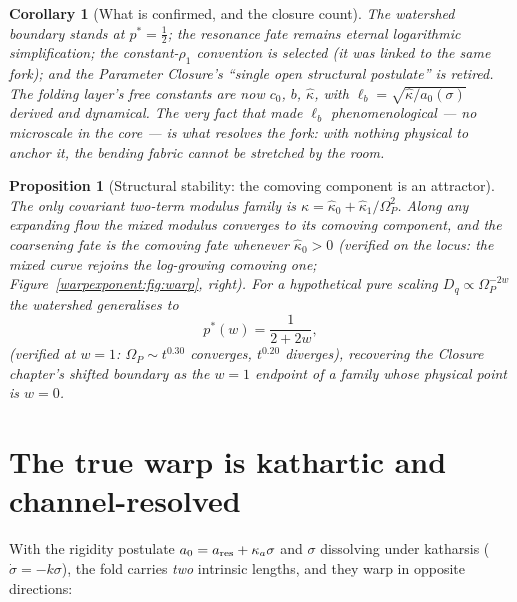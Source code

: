 \documentclass[11pt,a4paper,oneside]{book}
\newcommand{\Op}{\Omega_P}
\newcommand{\Dq}{D_q}
\newcommand{\lb}{\ell_b}
\newcommand{\kw}{\hat\kappa}
\theoremstyle{plain}
\newtheorem{proposition}{Proposition}[chapter]
\newtheorem{corollary}{Corollary}[chapter]
\theoremstyle{definition}
\theoremstyle{remark}
\begin{document}
\begin{corollary}[What is confirmed, and the closure count]
The watershed boundary stands at $p^*=\tfrac12$; the resonance fate remains eternal logarithmic
simplification; the constant-$\rho_1$ convention is selected (it was linked to the same fork); and the
Parameter Closure's ``single open structural postulate'' is retired. The folding layer's free constants
are now $c_0$, $b$, $\kw$, with $\lb=\sqrt{\kw/a_0(\sigma)}$ \emph{derived and dynamical}. The very
fact that made $\lb$ phenomenological --- no microscale in the core --- is what resolves the fork: with
nothing physical to anchor it, the bending fabric cannot be stretched by the room.
\end{corollary}

\begin{proposition}[Structural stability: the comoving component is an attractor]\label{warpexponent:prop:attract}
The only covariant two-term modulus family is $\kappa=\kw_0+\kw_1/\Op^2$. Along any expanding flow the
mixed modulus converges to its comoving component, and the coarsening fate is the comoving fate
whenever $\kw_0>0$ (verified on the locus: the mixed curve rejoins the log-growing comoving one;
Figure~\ref{warpexponent:fig:warp}, right). For a hypothetical pure scaling $\Dq\propto\Op^{-2w}$ the watershed
generalises to
\begin{equation}
p^*(w)=\frac{1}{2+2w},
\end{equation}
(verified at $w=1$: $\Op\sim t^{0.30}$ converges, $t^{0.20}$ diverges), recovering the Closure
chapter's shifted boundary as the $w=1$ endpoint of a family whose physical point is $w=0$.
\end{proposition}

\section{The true warp is kathartic and channel-resolved}

With the rigidity postulate $a_0=a_{\rm res}+\kappa_a\sigma$ and $\sigma$ dissolving under katharsis
($\dot\sigma=-k\sigma$), the fold carries \emph{two} intrinsic lengths, and they warp in opposite
directions:
\end{document}
